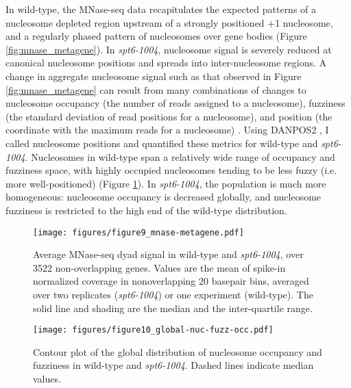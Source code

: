 \documentclass[9pt, letterpaper]{article}
\begin{document}
In wild-type, the MNase-seq data recapitulates the expected patterns of a nucleosome depleted region upstream of a strongly positioned +1 nucleosome, and a regularly phased pattern of nucleosomes over gene bodies (Figure \ref{fig:mnase_metagene}). In \textit{spt6-1004}, nucleosome signal is severely reduced at canonical nucleosome positions and spreads into inter-nucleosome regions. A change in aggregate nucleosome signal such as that observed in Figure \ref{fig:mnase_metagene} can result from many combinations of changes to nucleosome occupancy (the number of reads assigned to a nucleosome), fuzziness (the standard deviation of read positions for a nucleosome), and position (the coordinate with the maximum reads for a nucleosome) \cite{chen2013}. Using DANPOS2 \cite{chen2013}, I called nucleosome positions and quantified these metrics for wild-type and \textit{spt6-1004}. Nucleosomes in wild-type span a relatively wide range of occupancy and fuzziness space, with highly occupied nucleosomes tending to be less fuzzy (i.e. more well-positioned) (Figure \ref{fig:global_nuc_fuzz}). In \textit{spt6-1004}, the population is much more homogeneous: nucleosome occupancy is decreased globally, and nucleosome fuzziness is restricted to the high end of the wild-type distribution.

\begin{figure}[h]
    \centering
    \begin{minipage}[t]{8.5cm}
        \centering
        \texttt{[image: figures/figure9\_mnase-metagene.pdf]}
        \caption{Average MNase-seq dyad signal in wild-type and \textit{spt6-1004}, over 3522 non-overlapping genes. Values are the mean of spike-in normalized coverage in nonoverlapping 20 basepair bins, averaged over two replicates (\textit{spt6-1004}) or one experiment (wild-type). The solid line and shading are the median and the inter-quartile range.}
        \label{fig:mnase_metagene}
    \end{minipage}\hfill
    \begin{minipage}[t]{8.5cm}
        \centering
        \texttt{[image: figures/figure10\_global-nuc-fuzz-occ.pdf]}
        \caption{Contour plot of the global distribution of nucleosome occupancy and fuzziness in wild-type and \textit{spt6-1004}. Dashed lines indicate median values.}
        \label{fig:global_nuc_fuzz}
    \end{minipage}
\end{figure}
\end{document}
